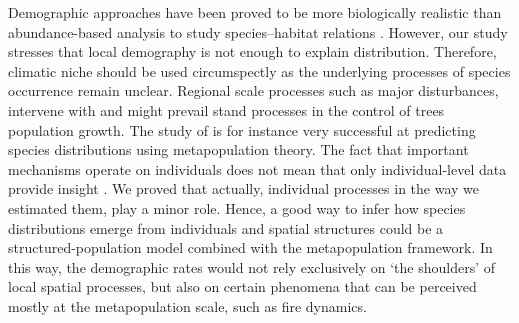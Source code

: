 Demographic approaches have been proved to be more biologically realistic than
abundance-based analysis to study species--habitat relations \citep{Bin2016}.
However, our study stresses that local demography is not enough to explain
distribution. Therefore, climatic niche should be used circumspectly as the
underlying processes of species occurrence remain unclear. Regional scale
processes such as major disturbances, intervene with and might prevail stand
processes in the control of trees population growth. The study of
\citet{Talluto2017a} is for instance very successful at predicting species
distributions using metapopulation theory. The fact that important mechanisms
operate on individuals does not mean that only individual-level data provide
insight \citep{Clark2011}. We proved that actually, individual processes in
the way we estimated them, play a minor role. Hence, a good way to infer how
species distributions emerge from individuals and spatial structures could be
a structured-population model combined with the metapopulation framework. In this way, the demographic rates would not rely exclusively on
‘the shoulders’ of local spatial processes, but also on certain phenomena that can be perceived mostly at the metapopulation scale, such as fire dynamics.
